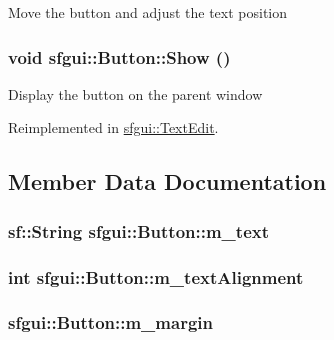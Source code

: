 Move the button and adjust the text position \hypertarget{classsfgui_1_1Button_94dc6919349ff5ca9f334cce78afbe39}{
\subsubsection[Show]{\setlength{\rightskip}{0pt plus 5cm}void sfgui::Button::Show ()}}
\label{classsfgui_1_1Button_94dc6919349ff5ca9f334cce78afbe39}




Display the button on the parent window 

Reimplemented in \hyperlink{classsfgui_1_1TextEdit_1ee03247816213b34caaff365b160de0}{sfgui::TextEdit}.

\subsection{Member Data Documentation}
\hypertarget{classsfgui_1_1Button_5a436a029fef79723eed0b024b5a7693}{
\subsubsection[m\_\-text]{\setlength{\rightskip}{0pt plus 5cm}sf::String {\bf sfgui::Button::m\_\-text}}}
\label{classsfgui_1_1Button_5a436a029fef79723eed0b024b5a7693}


\hypertarget{classsfgui_1_1Button_b1ca3893cbff9b09f42e16377c0073f9}{
\subsubsection[m\_\-textAlignment]{\setlength{\rightskip}{0pt plus 5cm}int {\bf sfgui::Button::m\_\-textAlignment}}}
\label{classsfgui_1_1Button_b1ca3893cbff9b09f42e16377c0073f9}


\hypertarget{classsfgui_1_1Button_20ee48b44f31ad5b5de11dc3b00103a7}{
\subsubsection[m\_\-margin]{ {\bf sfgui::Button::m\_\-margin}}}
\label{classsfgui_1_1Button_20ee48b44f31ad5b5de11dc3b00103a7}


